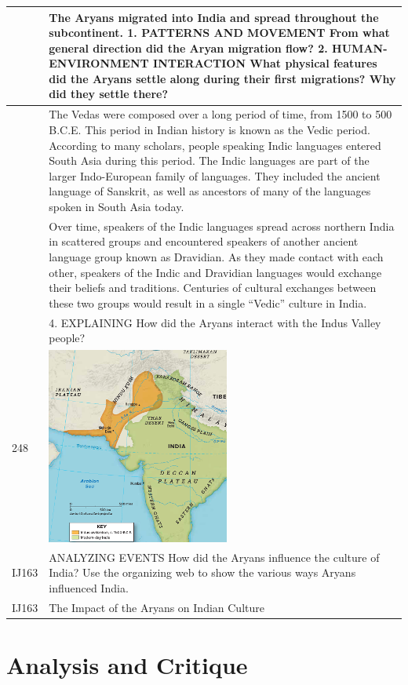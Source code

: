 \begin{longtable}{|>{\raggedleft}p{1.5cm}|p{8.5cm}|}
\hline
256 & The Aryans migrated into India and spread throughout the subcontinent. 1. PATTERNS AND MOVEMENT From what general direction did the Aryan migration flow? 2. HUMAN-ENVIRONMENT INTERACTION What physical features did the Aryans settle along during their first migrations? Why did they settle there? \tabularnewline
\hline
257 & The Vedas were composed over a long period of time, from 1500 to 500 B.C.E. This period in Indian history is known as the Vedic period. According to many scholars, people speaking Indic languages entered South Asia during this period. The Indic languages are part of the larger Indo-European family of languages. They included the ancient language of Sanskrit, as well as ancestors of many of the languages spoken in South Asia today. \tabularnewline
\hline
257 & Over time, speakers of the Indic languages spread across northern India in scattered groups and encountered speakers of another ancient language group known as Dravidian. As they made contact with each other, speakers of the Indic and Dravidian languages would exchange their beliefs and traditions. Centuries of cultural exchanges between these two groups would result in a single “Vedic” culture in India. \tabularnewline
\hline
259 & 4. EXPLAINING How did the Aryans interact with the Indus Valley people? \tabularnewline
\hline
\vbox{\hbox{}\hbox{248}\hbox{\phantom{\rule{0pt}{3.2cm}}}} & \vbox{\kern2pt\includegraphics[scale=0.4]{figures/chap4-fig3.png}\kern2pt} \tabularnewline
\hline
IJ163 & ANALYZING EVENTS How did the Aryans influence the culture of India? Use the organizing web to show the various ways Aryans influenced India. \tabularnewline
\hline
IJ163 & The Impact of the Aryans on Indian Culture \tabularnewline
\hline
\end{longtable}


\section*{Analysis and Critique} 

